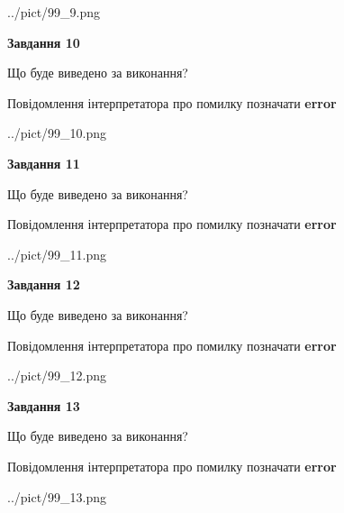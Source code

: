 \documentclass[11pt, ukrainian]{article}
\begin{document}
{\begin {large}
\begin{center}
	{../pict/99_9.png}
\end{center}
\newpage

{\begin {center}\textbf{Завдання 10}\end {center}}\par
Що буде виведено за виконання? \par
Повідомлення інтерпретатора про помилку позначати \textbf{error}

\begin{center}
	{../pict/99_10.png}
\end{center}
\newpage

{\begin {center}\textbf{Завдання 11}\end {center}}\par
Що буде виведено за виконання? \par
Повідомлення інтерпретатора про помилку позначати \textbf{error}

\begin{center}
	{../pict/99_11.png}
\end{center}
\newpage

{\begin {center}\textbf{Завдання 12}\end {center}}\par
Що буде виведено за виконання? \par
Повідомлення інтерпретатора про помилку позначати \textbf{error}

\begin{center}
	{../pict/99_12.png}
\end{center}
\newpage

{\begin {center}\textbf{Завдання 13}\end {center}}\par
Що буде виведено за виконання? \par
Повідомлення інтерпретатора про помилку позначати \textbf{error}

\begin{center}
	{../pict/99_13.png}
\end{center}
\newpage


\end{large}}
\end{document}
